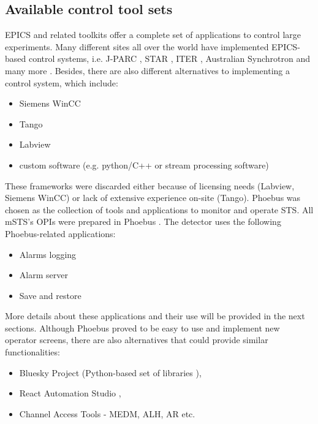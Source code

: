  \subsection{Available control tool sets}
 EPICS and related toolkits offer a complete set of applications to control large experiments. Many different sites all over the world have implemented EPICS-based control systems, i.e. \gls{J-PARC} \cite{J-PARC}, \gls{STAR} \cite{STAR}, \gls{ITER} \cite{ITER}, Australian Synchrotron and many more \cite{EPICS_site}. Besides, there are also different alternatives to implementing a control system, which include: 
 \begin{itemize}
     \item Siemens WinCC \cite{Camacho:2022fxa,Goralczyk:2022udx}
     \item Tango \cite{Santander-Vela:2021tma}
     \item Labview \cite{State:2022qlw} 
     \item custom software (e.g. python/C++ or stream processing software) \cite{taurus}
 \end{itemize} 
 These frameworks were discarded either because of licensing needs (Labview, Siemens WinCC) or lack of extensive experience on-site (Tango). Phoebus \cite{Phoebus} was chosen as the collection of tools and applications to monitor and operate \gls{STS}. All \gls{mSTS}'s \glspl{OPI} were prepared in Phoebus \cite{Phoebus}. The detector uses the following Phoebus-related applications:
\begin{itemize}
    \item Alarms logging
    \item Alarm server
    \item Save and restore
\end{itemize}
More details about these applications and their use will be provided in the next sections. Although Phoebus proved to be easy to use and implement new operator screens, there are also alternatives that could provide similar functionalities:
\begin{itemize}
    \item Bluesky Project (Python-based set of libraries \cite{Bluesky}),
    \item React Automation Studio \cite{React},
    \item Channel Access Tools - MEDM, \gls{ALH}, \gls{AR} etc. 
\end{itemize}

